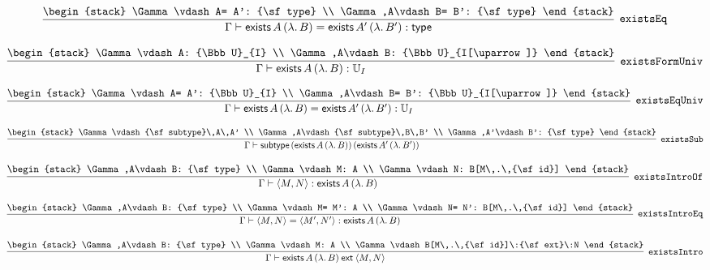 \[
\infer[{\tt existsEq}]{\Gamma \vdash {\sf exists}\,A\,(\lambda .\,B)= {\sf exists}\,A'\,(\lambda .\,B'): {\sf type}}{
\begin{stack}
\Gamma \vdash A= A': {\sf type}
\\
\Gamma ,A\vdash B= B': {\sf type}
\end{stack}}
\]

\[
\infer[{\tt existsFormUniv}]{\Gamma \vdash {\sf exists}\,A\,(\lambda .\,B): {\Bbb U}_{I}}{
\begin{stack}
\Gamma \vdash A: {\Bbb U}_{I}
\\
\Gamma ,A\vdash B: {\Bbb U}_{I[\uparrow ]}
\end{stack}}
\]

\[
\infer[{\tt existsEqUniv}]{\Gamma \vdash {\sf exists}\,A\,(\lambda .\,B)= {\sf exists}\,A'\,(\lambda .\,B'): {\Bbb U}_{I}}{
\begin{stack}
\Gamma \vdash A= A': {\Bbb U}_{I}
\\
\Gamma ,A\vdash B= B': {\Bbb U}_{I[\uparrow ]}
\end{stack}}
\]

\[
\infer[{\tt existsSub}]{\Gamma \vdash {\sf subtype}\,({\sf exists}\,A\,(\lambda .\,B))\,({\sf exists}\,A'\,(\lambda .\,B'))}{
\begin{stack}
\Gamma \vdash {\sf subtype}\,A\,A'
\\
\Gamma ,A\vdash {\sf subtype}\,B\,B'
\\
\Gamma ,A'\vdash B': {\sf type}
\end{stack}}
\]

\[
\infer[{\tt existsIntroOf}]{\Gamma \vdash \langle M,N\rangle : {\sf exists}\,A\,(\lambda .\,B)}{
\begin{stack}
\Gamma ,A\vdash B: {\sf type}
\\
\Gamma \vdash M: A
\\
\Gamma \vdash N: B[M\,.\,{\sf id}]
\end{stack}}
\]

\[
\infer[{\tt existsIntroEq}]{\Gamma \vdash \langle M,N\rangle = \langle M',N'\rangle : {\sf exists}\,A\,(\lambda .\,B)}{
\begin{stack}
\Gamma ,A\vdash B: {\sf type}
\\
\Gamma \vdash M= M': A
\\
\Gamma \vdash N= N': B[M\,.\,{\sf id}]
\end{stack}}
\]

\[
\infer[{\tt existsIntro}]{\Gamma \vdash {\sf exists}\,A\,(\lambda .\,B)\:{\sf ext}\:\langle M,N\rangle }{
\begin{stack}
\Gamma ,A\vdash B: {\sf type}
\\
\Gamma \vdash M: A
\\
\Gamma \vdash B[M\,.\,{\sf id}]\:{\sf ext}\:N
\end{stack}}
\]

